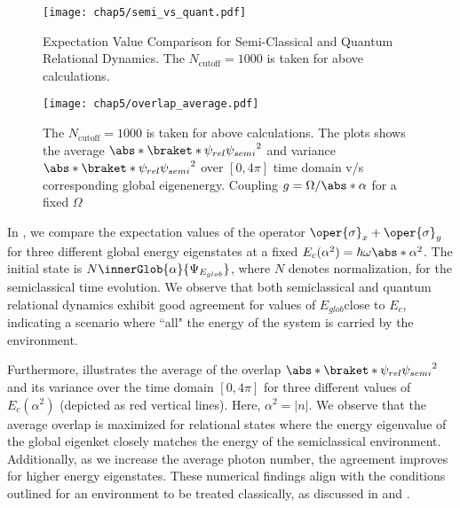 \begin{figure}[!h]
        \label{fig:chap5_JCM_semi_vs_quant}
        \centering
        \texttt{[image: chap5/semi\_vs\_quant.pdf]}
        \caption[Expectation Value Comparison for Semi-Classical and
         Quantum Relational Dynamics]{Expectation Value Comparison 
         for Semi-Classical and Quantum Relational Dynamics. The $N_{\mathrm{cutoff}}=1000$ is taken for above calculations.}
\end{figure}
\begin{figure}[!h]
        \label{fig:chap5_JCM_overlap_avg}
        \centering
        \texttt{[image: chap5/overlap\_average.pdf]}
        \caption[Average $\abs*{\braket*{\psi_{rel}}{\psi_{semi}}}^2$ 
        (\& variance $\abs*{\braket*{\psi_{rel}}{\psi_{semi}}}^2$)
         v/s Global Eigen Energy]{The $N_{\mathrm{cutoff}}=1000$ is taken for above calculations.
         The plots shows the average $\abs*{\braket*{\psi_{rel}}{\psi_{semi}}}^2$ and 
         variance $\abs*{\braket*{\psi_{rel}}{\psi_{semi}}}^2$ over \([0, 4\pi]\) time domain 
         v/s corresponding global eigenenergy.
         Coupling \(g = \Omega / \abs*{\alpha}\) for a fixed \(\Omega\)}
\end{figure}

In , we compare the expectation values of the operator 
\(\oper{\sigma}_x + \oper{\sigma}_y\)  for three different global energy eigenstates at a fixed 
\(E_c(\alpha^2) = \hbar \omega \abs*{\alpha}^2\). The initial state is \(N\innerGlob{\alpha}{\Psi_{E_{glob}}}\), where $N$ denotes normalization, 
for the semiclassical time evolution. We observe that both semiclassical and quantum relational dynamics exhibit 
good agreement for values of $E_{glob}$​ close to $E_c$​, indicating a scenario where ``all" the energy of the system 
is carried by the environment.

Furthermore,  illustrates the average of the overlap 
\(\abs*{\braket*{\psi_{rel}}{\psi_{semi}}}^2\) 
 and its variance over the time domain 
 \([0, 4\pi]\) for three different values of $E_c(\alpha^2)$ (depicted as red vertical lines). 
Here, \(\alpha^2 = \lvert n \rvert\). We observe that the average overlap is maximized for relational states 
where the energy eigenvalue of the global eigenket closely matches the energy of the semiclassical 
environment. Additionally, as we increase the average photon number, the agreement improves for 
higher energy eigenstates. These numerical findings align with the conditions outlined for an 
environment to be treated classically, as discussed in  and 
.

